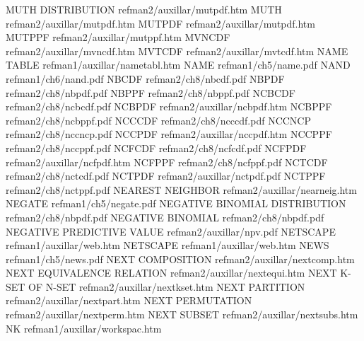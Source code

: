 MUTH DISTRIBUTION                       refman2/auxillar/mutpdf.htm
MUTH                                    refman2/auxillar/mutpdf.htm
MUTPDF                                  refman2/auxillar/mutpdf.htm
MUTPPF                                  refman2/auxillar/mutppf.htm
MVNCDF                                  refman2/auxillar/mvncdf.htm
MVTCDF                                  refman2/auxillar/mvtcdf.htm
NAME TABLE                              refman1/auxillar/nametabl.htm
NAME                                    refman1/ch5/name.pdf
NAND                                    refman1/ch6/nand.pdf
NBCDF                                   refman2/ch8/nbcdf.pdf
NBPDF                                   refman2/ch8/nbpdf.pdf
NBPPF                                   refman2/ch8/nbppf.pdf
NCBCDF                                  refman2/ch8/ncbcdf.pdf
NCBPDF                                  refman2/auxillar/ncbpdf.htm
NCBPPF                                  refman2/ch8/ncbppf.pdf
NCCCDF                                  refman2/ch8/ncccdf.pdf
NCCNCP                                  refman2/ch8/nccncp.pdf
NCCPDF                                  refman2/auxillar/nccpdf.htm
NCCPPF                                  refman2/ch8/nccppf.pdf
NCFCDF                                  refman2/ch8/ncfcdf.pdf
NCFPDF                                  refman2/auxillar/ncfpdf.htm
NCFPPF                                  refman2/ch8/ncfppf.pdf
NCTCDF                                  refman2/ch8/nctcdf.pdf
NCTPDF                                  refman2/auxillar/nctpdf.pdf
NCTPPF                                  refman2/ch8/nctppf.pdf
NEAREST NEIGHBOR                        refman2/auxillar/nearneig.htm
NEGATE                                  refman1/ch5/negate.pdf
NEGATIVE BINOMIAL DISTRIBUTION          refman2/ch8/nbpdf.pdf
NEGATIVE BINOMIAL                       refman2/ch8/nbpdf.pdf
NEGATIVE PREDICTIVE VALUE               refman2/auxillar/npv.pdf
NETSCAPE                                refman1/auxillar/web.htm
NETSCAPE                                refman1/auxillar/web.htm
NEWS                                    refman1/ch5/news.pdf
NEXT COMPOSITION                        refman2/auxillar/nextcomp.htm
NEXT EQUIVALENCE RELATION               refman2/auxillar/nextequi.htm
NEXT K-SET OF N-SET                     refman2/auxillar/nextkset.htm
NEXT PARTITION                          refman2/auxillar/nextpart.htm
NEXT PERMUTATION                        refman2/auxillar/nextperm.htm
NEXT SUBSET                             refman2/auxillar/nextsubs.htm
NK                                      refman1/auxillar/workspac.htm
